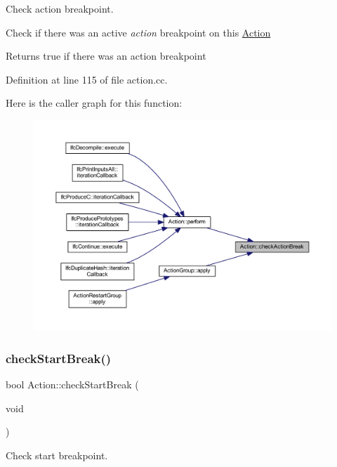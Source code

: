 Check action breakpoint. 

Check if there was an active {\itshape action} breakpoint on this \mbox{\hyperlink{class_action}{Action}} \begin{DoxyReturn}{Returns}
true if there was an action breakpoint 
\end{DoxyReturn}


Definition at line 115 of file action.\+cc.

Here is the caller graph for this function\+:
\nopagebreak
\begin{figure}[H]
\begin{center}
\leavevmode
\includegraphics[width=350pt]{class_action_a81d7c72d8a23e60786cc47fc52d2112f_icgraph}
\end{center}
\end{figure}
\mbox{\label{class_action_a2b657446cbd46f656b1d9f2dcbb1f4dc}} 
\subsubsection{\texorpdfstring{checkStartBreak()}{checkStartBreak()}}
{\footnotesize\ttfamily bool Action\+::check\+Start\+Break (\begin{DoxyParamCaption}\item[{void}]{ }\end{DoxyParamCaption})\hspace{0.3cm}{\ttfamily [protected]}}



Check start breakpoint. 

